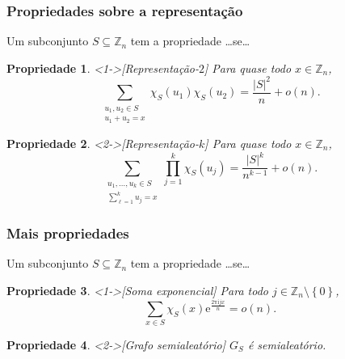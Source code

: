 \documentclass{beamer}
\def\MMe{\mathrm{e}} %
\def\MMi{\mathrm{i}} %
\def\MMpi{\mathrm{\pi}}
\def\MMZ{\mathbb{Z}} %
\def\MMp{\mathrm{.}} %
\def\chaves#1{\left\{ #1 \right\}} %
\def\cj#1{\chaves{#1}} %
\theoremstyle{teoaxicorlem}
\newtheorem{Propr}{Propriedade}
\theoremstyle{defnotnom}
\begin{document}
\begin{frame}
  \frametitle{Propriedades sobre a representação}
  \footnotesize
  Um subconjunto $S\subseteq\MMZ_n$ tem a propriedade \dots se\dots
  \begin{Propr}<1->[Representação-$2$]
    \footnotesize
    Para quase todo $x\in\MMZ_n$,
    \begin{equation*}
      \sum_{\substack{u_1,u_2\in S\\u_1+u_2=x}}
      \chi_S(u_1)\chi_S(u_2) =
      \frac{|S|^2}{n} + o(n)\MMp
    \end{equation*}
  \end{Propr}
  \vfill
  \begin{Propr}<2->[Representação-$k$]
    \footnotesize
    Para quase todo $x\in\MMZ_n$,
    \begin{equation*}
      \sum_{\substack{u_1,\dotsc,u_k\in S\\\sum_{\ell=1}^ku_j=x}}
      \prod_{j=1}^k\chi_S(u_j) =
      \frac{|S|^k}{n^{k-1}} + o(n)\MMp
    \end{equation*}
  \end{Propr}
\end{frame}

\begin{frame}
  \frametitle{Mais propriedades}
  Um subconjunto $S\subseteq\MMZ_n$ tem a propriedade \dots se\dots
  \begin{Propr}<1->[Soma exponencial]
    Para todo $j\in\MMZ_n\setminus\cj{0}$,
    \begin{equation*}
      \sum_{x\in S}\chi_S(x){\MMe}^{\frac{2\MMpi\MMi jx}{n}}=o(n)\MMp
    \end{equation*}
  \end{Propr}
  \vfill
  \begin{Propr}<2->[Grafo semialeatório]
    $G_S$ é semialeatório.
  \end{Propr}
\end{frame}
\end{document}
